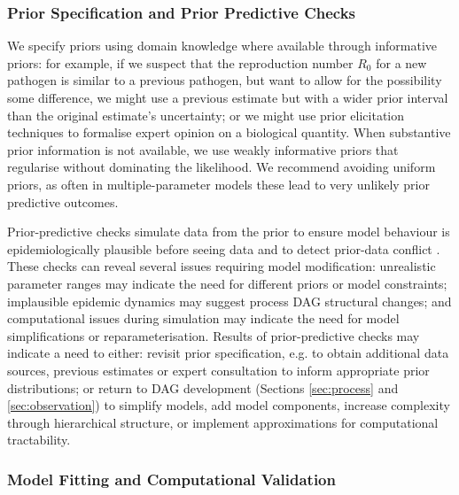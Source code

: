 \documentclass{article}
\begin{document}
\subsubsection{Prior Specification and Prior Predictive Checks}

We specify priors using domain knowledge where available through informative priors: for example, if we suspect that the reproduction number $R_0$ for a new pathogen is similar to a previous pathogen, but want to allow for the possibility some difference, we might use a previous estimate but with a wider prior interval than the original estimate's uncertainty; or we might use prior elicitation techniques \citep{o2006uncertain} to formalise expert opinion on a biological quantity. When substantive prior information is not available, we use weakly informative priors that regularise without dominating the likelihood. We recommend avoiding uniform priors, as often in multiple-parameter models these lead to very unlikely prior predictive outcomes.

Prior-predictive checks simulate data from the prior to ensure model behaviour is epidemiologically plausible before seeing data and to detect prior-data conflict \citep{Box1980,yang2025detecting}.
These checks can reveal several issues requiring model modification: unrealistic parameter ranges may indicate the need for different priors or model constraints; implausible epidemic dynamics may suggest process \ac{DAG} structural changes; and computational issues during simulation may indicate the need for model simplifications or reparameterisation.
Results of prior-predictive checks may indicate a need to either: revisit prior specification, e.g. to obtain additional data sources, previous estimates or expert consultation to inform appropriate prior distributions; or return to \ac{DAG} development (Sections \ref{sec:process} and \ref{sec:observation}) to simplify models, add model components, increase complexity through hierarchical structure, or implement approximations for computational tractability.

\subsubsection{Model Fitting and Computational Validation}
\end{document}
